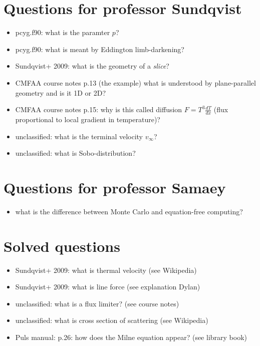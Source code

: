 \documentclass[../main/main.tex]{subfiles}
\begin{document}
\section{Questions for professor Sundqvist}
\begin{itemize}
\item pcyg.f90: what is the paramter $p$?
\item pcyg.f90: what is meant by Eddington limb-darkening?
\item Sundqvist+ 2009: what is the geometry of a \textit{slice}?
\item CMFAA course notes p.13 (the example) what is understood by plane-parallel geometry and is it 1D or 2D?
\item CMFAA course notes p.15: why is this called diffusion $F=T^3 \frac{dT}{dx}$ (flux proportional to local gradient in temperature)?
\item unclassified: what is the terminal velocity $v_{\infty}$?
\item unclassified: what is Sobo-distribution?
\end{itemize}

\newpage
\section{Questions for professor Samaey}
\begin{itemize}
\item what is the difference between Monte Carlo and equation-free computing?
\end{itemize}

\newpage
\section{Solved questions}
\begin{itemize}
\item Sundqvist+ 2009: what is thermal velocity (see Wikipedia)
\item Sundqvist+ 2009: what is line force (see explanation Dylan)
\item unclassified: what is a flux limiter? (see course notes)
\item unclassified: what is cross section of scattering (see Wikipedia)
\item Puls manual: p.26: how does the Milne equation appear? (see library book)
\end{itemize}
\end{document}
